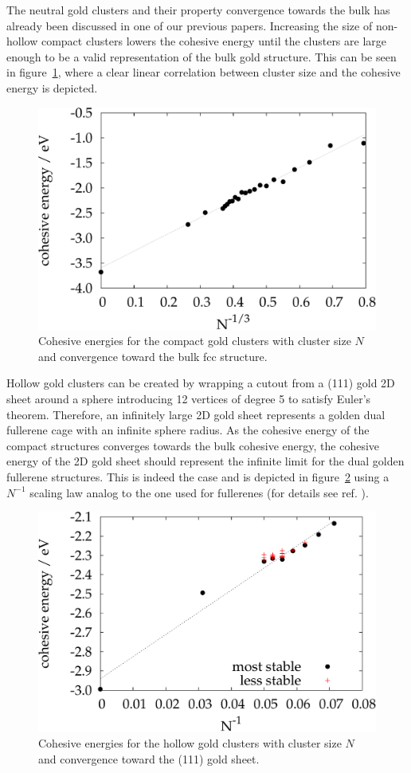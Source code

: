 The neutral gold clusters and their property convergence towards the bulk has
already been discussed in one of our previous
papers.\autocite{Assadollahzadeh_systematicsearchminimum_2009} Increasing the
size of non-hollow compact clusters lowers the cohesive energy until the
clusters are large enough to be a valid representation of the bulk gold
structure.  This can be seen in figure~\ref{fig:cohesiveenergies1}, where a
clear linear correlation between cluster size and the cohesive energy is
depicted.
%
\begin{figure}\centering
	\includegraphics[width=.8\textwidth]{golddual/cohesive.pdf}
	\caption{Cohesive energies for the compact gold clusters with cluster size $N$ and convergence toward the bulk fcc structure.}
	\label{fig:cohesiveenergies1}
\end{figure}
%
Hollow gold clusters can be created by wrapping a cutout from a (111) gold 2D
sheet around a sphere introducing 12 vertices of degree 5 to satisfy Euler's
theorem.  Therefore, an infinitely large 2D gold sheet represents a golden dual
fullerene cage with an infinite sphere radius. As the cohesive energy of the
compact structures converges towards the bulk cohesive energy, the cohesive
energy of the 2D gold sheet should represent the infinite limit for the dual
golden fullerene structures. This is indeed the case and is depicted in
figure~\ref{fig:cohesiveenergies2} using a $N^{-1}$ scaling law analog to the
one used for fullerenes (for details see
ref. \cite{Wirz_smallfullerenesgraphene_2015}). 

\begin{figure}\centering
	\includegraphics[width=.8\textwidth]{golddual/cohesive2.pdf}
	\caption{Cohesive energies for the hollow gold clusters with cluster size $N$ and convergence toward the (111) gold sheet.}
	\label{fig:cohesiveenergies2}
\end{figure}

